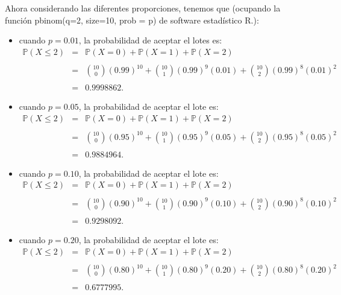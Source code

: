 \documentclass[11pt,letterpaper]{article}
\newcommand{\mP}{\mathbb{P}}
\begin{document}
\begin{enumerate}
Ahora considerando las diferentes proporciones, tenemos que (ocupando la función \textsf{pbinom(q=2, size=10, prob = p)} de software estadístico R.):

\begin{itemize}
\item cuando $p=0.01$, la probabilidad de aceptar el lotes es:
\begin{equation*}
\begin{array}{ccl}
\mP(X\leq 2)&=&\mP(X=0)+\mP(X=1)+\mP(X=2)\\
&& \\
&=&{10\choose0}(0.99)^{10}+{10\choose1}(0.99)^9(0.01)+{10\choose2}(0.99)^8(0.01)^2\\
&&\\
&=&0.9998862.
\end{array}
\end{equation*}

\item cuando $p=0.05$, la probabilidad de aceptar el lote es: 
\begin{equation*}
\begin{array}{ccl}
\mP(X\leq 2)&=&\mP(X=0)+\mP(X=1)+\mP(X=2)\\
&& \\
&=&{10\choose0}(0.95)^{10}+{10\choose1}(0.95)^9(0.05)+{10\choose2}(0.95)^8(0.05)^2\\
&& \\
&=& 0.9884964.
\end{array}
\end{equation*}

\item cuando $p=0.10$, la probabilidad de aceptar el lote es: 
\begin{equation*}
\begin{array}{ccl}
\mP(X\leq 2)&=&\mP(X=0)+\mP(X=1)+\mP(X=2)\\
&& \\
&=&{10\choose0}(0.90)^{10}+{10\choose1}(0.90)^9(0.10)+{10\choose2}(0.90)^8(0.10)^2\\
&& \\
&=& 0.9298092.
\end{array}
\end{equation*}

\item cuando $p=0.20$, la probabilidad de aceptar el lote es: 
\begin{equation*}
\begin{array}{ccl}
\mP(X\leq 2)&=&\mP(X=0)+\mP(X=1)+\mP(X=2)\\
&& \\
&=&{10\choose0}(0.80)^{10}+{10\choose1}(0.80)^9(0.20)+{10\choose2}(0.80)^8(0.20)^2\\
&& \\
&=& 0.6777995.
\end{array}
\end{equation*}


\end{itemize}
\end{enumerate}
\end{document}

